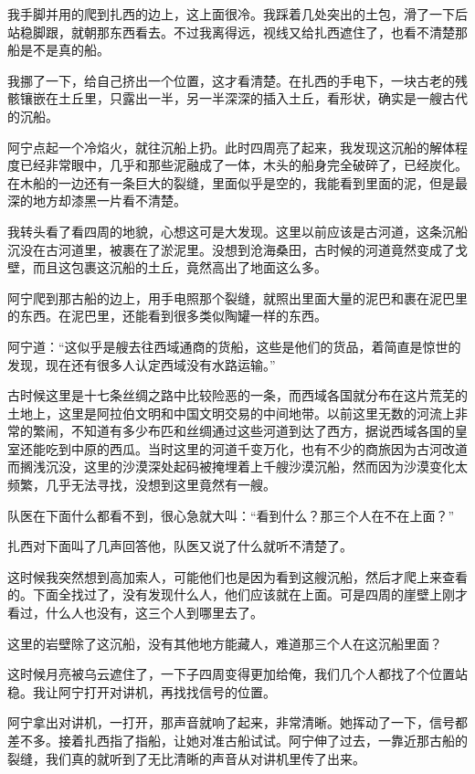 我手脚并用的爬到扎西的边上，这上面很冷。我踩着几处突出的土包，滑了一下后站稳脚跟，就朝那东西看去。不过我离得远，视线又给扎西遮住了，也看不清楚那船是不是真的船。

我挪了一下，给自己挤出一个位置，这才看清楚。在扎西的手电下，一块古老的残骸镶嵌在土丘里，只露出一半，另一半深深的插入土丘，看形状，确实是一艘古代的沉船。

阿宁点起一个冷焰火，就往沉船上扔。此时四周亮了起来，我发现这沉船的解体程度已经非常眼中，几乎和那些泥融成了一体，木头的船身完全破碎了，已经炭化。在木船的一边还有一条巨大的裂缝，里面似乎是空的，我能看到里面的泥，但是最深的地方却漆黑一片看不清楚。

我转头看了看四周的地貌，心想这可是大发现。这里以前应该是古河道，这条沉船沉没在古河道里，被裹在了淤泥里。没想到沧海桑田，古时候的河道竟然变成了戈壁，而且这包裹这沉船的土丘，竟然高出了地面这么多。

阿宁爬到那古船的边上，用手电照那个裂缝，就照出里面大量的泥巴和裹在泥巴里的东西。在泥巴里，还能看到很多类似陶罐一样的东西。

阿宁道：“这似乎是艘去往西域通商的货船，这些是他们的货品，着简直是惊世的发现，现在还有很多人认定西域没有水路运输。”

古时候这里是十七条丝绸之路中比较险恶的一条，而西域各国就分布在这片荒芜的土地上，这里是阿拉伯文明和中国文明交易的中间地带。以前这里无数的河流上非常的繁闹，不知道有多少布匹和丝绸通过这些河道到达了西方，据说西域各国的皇室还能吃到中原的西瓜。当时这里的河道千变万化，也有不少的商旅因为古河改道而搁浅沉没，这里的沙漠深处起码被掩埋着上千艘沙漠沉船，然而因为沙漠变化太频繁，几乎无法寻找，没想到这里竟然有一艘。

队医在下面什么都看不到，很心急就大叫：“看到什么？那三个人在不在上面？”

扎西对下面叫了几声回答他，队医又说了什么就听不清楚了。

这时候我突然想到高加索人，可能他们也是因为看到这艘沉船，然后才爬上来查看的。下面全找过了，没有发现什么人，他们应该就在上面。可是四周的崖壁上刚才看过，什么人也没有，这三个人到哪里去了。

这里的岩壁除了这沉船，没有其他地方能藏人，难道那三个人在这沉船里面？

这时候月亮被乌云遮住了，一下子四周变得更加给俺，我们几个人都找了个位置站稳。我让阿宁打开对讲机，再找找信号的位置。

阿宁拿出对讲机，一打开，那声音就响了起来，非常清晰。她挥动了一下，信号都差不多。接着扎西指了指船，让她对准古船试试。阿宁伸了过去，一靠近那古船的裂缝，我们真的就听到了无比清晰的声音从对讲机里传了出来。

